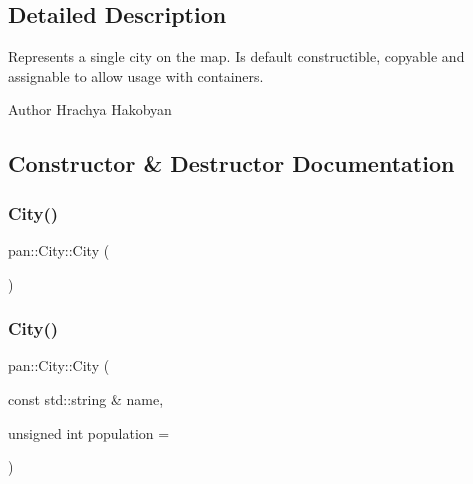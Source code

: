 \subsection{Detailed Description}
Represents a single city on the map. Is default constructible, copyable and assignable to allow usage with containers. 

\begin{DoxyAuthor}{Author}
Hrachya Hakobyan 
\end{DoxyAuthor}


\subsection{Constructor \& Destructor Documentation}
\mbox{\label{classpan_1_1_city_abf8a8407beecfc243044a6928960dc25}} 
\subsubsection{\texorpdfstring{City()}{City()}\hspace{0.1cm}{\footnotesize\ttfamily [1/5]}}
{\footnotesize\ttfamily pan\+::\+City\+::\+City (\begin{DoxyParamCaption}{ }\end{DoxyParamCaption})}

\mbox{\label{classpan_1_1_city_a0a167d009ec26423e3f64a952e6f5835}} 
\subsubsection{\texorpdfstring{City()}{City()}\hspace{0.1cm}{\footnotesize\ttfamily [2/5]}}
{\footnotesize\ttfamily pan\+::\+City\+::\+City (\begin{DoxyParamCaption}\item[{const std\+::string \&}]{name,  }\item[{unsigned int}]{population = {} }\end{DoxyParamCaption})}

\mbox{\label{classpan_1_1_city_ae007f3169e698aa000bd8d20de1e278b}} 
